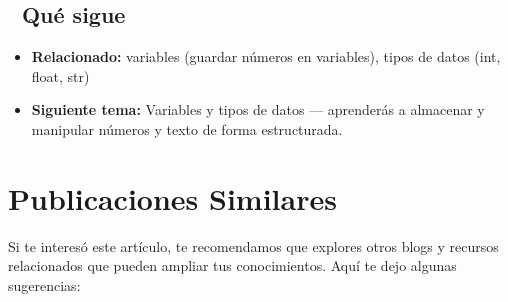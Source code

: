 \documentclass[
  doc,
  floatsintext,
  longtable,
  a4paper,
  nolmodern,
  notxfonts,
  notimes,
  12pt,
  colorlinks=true,linkcolor=blue,citecolor=blue,urlcolor=blue]{apa7}
\providecommand{\tightlist}{%
  \setlength{\itemsep}{0pt}\setlength{\parskip}{0pt}}
\begin{document}
\subsection{🔗 Qué sigue}\label{quuxe9-sigue}

\begin{itemize}
\tightlist
\item
  \textbf{Relacionado:} variables (guardar números en variables), tipos
  de datos (int, float, str)
\item
  \textbf{Siguiente tema:} Variables y tipos de datos --- aprenderás a
  almacenar y manipular números y texto de forma estructurada.
\end{itemize}

\section{Publicaciones Similares}\label{publicaciones-similares}

Si te interesó este artículo, te recomendamos que explores otros blogs y
recursos relacionados que pueden ampliar tus conocimientos. Aquí te dejo
algunas sugerencias:
\end{document}
